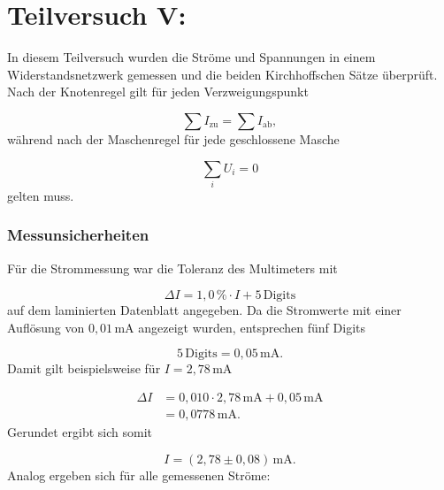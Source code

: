 \documentclass{report}
\begin{document}
\section{Teilversuch V: }
\noindent
In diesem Teilversuch wurden die Ströme und Spannungen in einem
Widerstandsnetzwerk gemessen und die beiden Kirchhoffschen Sätze überprüft.
\noindent
Nach der Knotenregel gilt für jeden Verzweigungspunkt

\begin{equation}
\sum I_\mathrm{zu}
=
\sum I_\mathrm{ab},
\end{equation}
\noindent
während nach der Maschenregel für jede geschlossene Masche

\begin{equation}
\sum_i U_i=0
\end{equation}
\noindent
gelten muss.

\subsubsection{Messunsicherheiten}
\noindent
Für die Strommessung war die Toleranz des Multimeters mit

\begin{equation}
\Delta I
=
1{,}0\,\%\cdot I + 5\,\mathrm{Digits}
\end{equation}
\noindent
auf dem laminierten Datenblatt angegeben.
\noindent
Da die Stromwerte mit einer Auflösung von $0{,}01\,\mathrm{mA}$ angezeigt
wurden, entsprechen fünf Digits

\begin{equation}
5\,\mathrm{Digits}=0{,}05\,\mathrm{mA}.
\end{equation}
\noindent
Damit gilt beispielsweise für $I=2{,}78\,\mathrm{mA}$

\begin{align}
\Delta I
&=
0{,}010\cdot2{,}78\,\mathrm{mA}
+
0{,}05\,\mathrm{mA}\\
&=
0{,}0778\,\mathrm{mA}.
\end{align}
\noindent
Gerundet ergibt sich somit

\begin{equation}
I=(2{,}78\pm0{,}08)\,\mathrm{mA}.
\end{equation}
\noindent
Analog ergeben sich für alle gemessenen Ströme:
\end{document}
